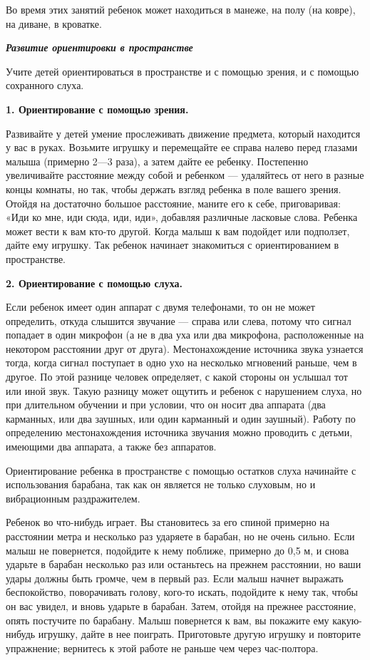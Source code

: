 \documentclass[a5paper]{book}
\renewcommand{\emph}[1]{\textit{#1}}
\begin{document}
Во время этих занятий ребенок может находиться в манеже, на полу (на
ковре), на диване, в кроватке.

\emph{\textbf{Развитие ориентировки в пространстве}}

Учите детей ориентироваться в пространстве и с помощью зрения, и с
помощью сохранного слуха.

\textbf{1. Ориентирование с помощью зрения.}

Развивайте у детей умение прослеживать движение предмета, который
находится у вас в руках. Возьмите игрушку и перемещайте ее справа налево
перед глазами малыша (примерно 2---3 раза), а затем дайте ее ребенку.
Постепенно увеличивайте расстояние между собой и ребенком --- удаляйтесь
от него в разные концы комнаты, но так, чтобы держать взгляд ребенка в
поле вашего зрения. Отойдя на достаточно большое расстояние, маните его
к себе, приговаривая: «Иди ко мне, иди сюда, иди, иди», добавляя
различные ласковые слова. Ребенка может вести к вам кто-то другой. Когда
малыш к вам подойдет или подползет, дайте ему игрушку. Так ребенок
начинает знакомиться с ориентированием в пространстве.

\textbf{2. Ориентирование с помощью слуха.}

Если ребенок имеет один аппарат с двумя телефонами, то он не может
определить, откуда слышится звучание --- справа или слева, потому что
сигнал попадает в один микрофон (а не в два уха или два микрофона,
расположенные на некотором расстоянии друг от друга). Местонахождение
источника звука узнается тогда, когда сигнал поступает в одно ухо на
несколько мгновений раньше, чем в другое. По этой разнице человек
определяет, с какой стороны он услышал тот или иной звук. Такую разницу
может ощутить и ребенок с нарушением слуха, но при длительном обучении и
при условии, что он носит два аппарата (два карманных, или два заушных,
или один карманный и один заушный). Работу по определению
местонахождения источника звучания можно проводить с детьми, имеющими
два аппарата, а также без аппаратов.

Ориентирование ребенка в пространстве с помощью остатков слуха начинайте
с использования барабана, так как он является не только слуховым, но и
вибрационным раздражителем.

Ребенок во что-нибудь играет. Вы становитесь за его спиной примерно на
расстоянии метра и несколько раз ударяете в барабан, но не очень сильно.
Если малыш не повернется, подойдите к нему поближе, примерно до 0,5 м, и
снова ударьте в барабан несколько раз или останьтесь на прежнем
расстоянии, но ваши удары должны быть громче, чем в первый раз. Если
малыш начнет выражать беспокойство, поворачивать голову, кого-то искать,
подойдите к нему так, чтобы он вас увидел, и вновь ударьте в барабан.
Затем, отойдя на прежнее расстояние, опять постучите по барабану. Малыш
повернется к вам, вы покажите ему какую-нибудь игрушку, дайте в нее
поиграть. Приготовьте другую игрушку и повторите упражнение; вернитесь к
этой работе не раньше чем через час-полтора.
\end{document}
